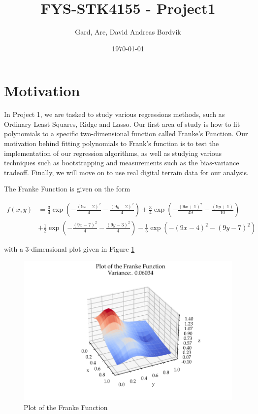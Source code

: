 \documentclass[11pt, a4paper]{article}
\title{FYS-STK4155 - Project1}
\author{Gard, Are, David Andreas Bordvik}
\date{\today}
\begin{document}
\maketitle
  
\section*{Motivation}
In Project 1, we are tasked to study various regressions methods, such as Ordinary Least Squares, Ridge and Lasso. Our first area of study is how to fit polynomials to a specific two-dimensional function called Franke's Function. Our motivation behind fitting polynomials to Frank's function is to test the implementation of our regression algorithms, as well as studying various techniques such as bootstrapping and measurements such as the bias-variance tradeoff. Finally, we will move on to use real digital terrain data for our analysis.

The Franke Function is given on the form

\begin{align*}
f(x,y) &= \frac{3}{4}\exp{\left(-\frac{(9x-2)^2}{4} - \frac{(9y-2)^2}{4}\right)}+\frac{3}{4}\exp{\left(-\frac{(9x+1)^2}{49}- \frac{(9y+1)}{10}\right)} \\
&+\frac{1}{2}\exp{\left(-\frac{(9x-7)^2}{4} - \frac{(9y-3)^2}{4}\right)} -\frac{1}{5}\exp{\left(-(9x-4)^2 - (9y-7)^2\right) }
\end{align*}

with a 3-dimensional plot given in Figure \ref{fig:1}

\begin{figure}[h]
  \centering
  \includegraphics[scale=0.75]{figures/EX1_franke_function_nonoise_preview.pdf}
  \caption{\label{fig:1}Plot of the Franke Function}
\end{figure}
\end{document}
